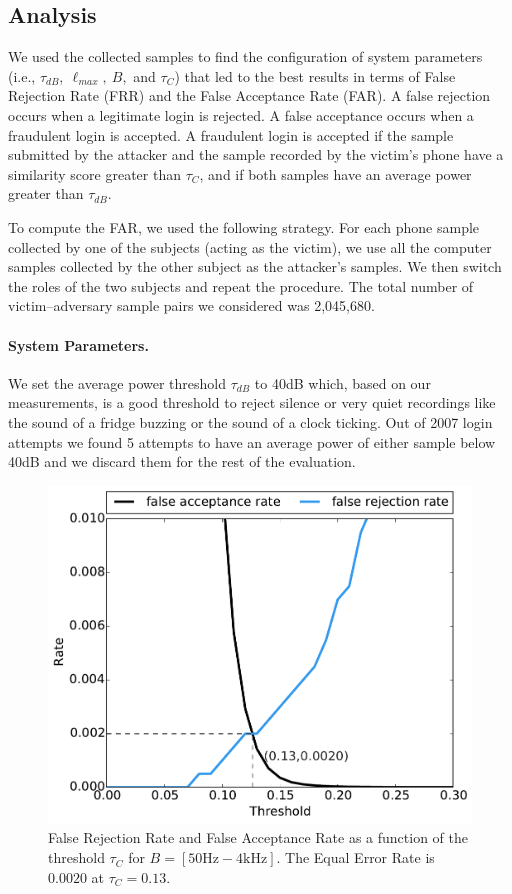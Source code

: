 \subsection{Analysis}
\label{sec:ps_sp_parameters}
We used the collected samples to find the configuration of system parameters (i.e., $\tau_{dB},\ \ell_{max},\ B,$ and $\tau_C$) that led to
the best results in terms of False Rejection Rate (FRR) and the False Acceptance Rate (FAR).
A false rejection occurs when a legitimate login is rejected.
A false acceptance occurs when a fraudulent login is accepted.
A fraudulent login is accepted if the sample submitted by the attacker
and the sample recorded by the victim's phone have a similarity score greater than $\tau_C$, and if both samples have an average power greater than $\tau_{dB}$.

To compute the FAR, we used the following strategy.
For each phone sample collected by one of the subjects (acting as the victim),
we use all the computer samples collected by the other subject as the attacker's samples. We then switch the roles of the two subjects and repeat the procedure.
The total number of victim--adversary sample pairs we considered was
2,045,680.

\paragraph{System Parameters.}
We set the average power threshold $\tau_{dB}$ to 40dB which, based on our measurements,
is a good threshold to reject silence or very quiet recordings like the sound of a fridge buzzing or the sound of a clock ticking.
Out of 2007 login attempts we found 5 attempts to have an average power of either sample below 40dB and we discard them for the rest of the evaluation.

\begin{figure}[!ht]
    \centering
    \includegraphics[width=.8\linewidth]{figures/phonesecures/sound-proof_falsepositives_50-4000.pdf}
    
    \caption[{False Rejection Rate and False Acceptance Rate as a function of the
    threshold $\tau_C$ for $B=[50\text{Hz}-4\text{kHz}]$}]{False Rejection Rate and
    False Acceptance Rate as a function of the threshold $\tau_C$ for
    $B=[50\text{Hz}-4\text{kHz}]$. The Equal Error Rate is $0.0020$ at $\tau_{C}=0.13.$}
    
    \label{fig:ps_sp_eer_average}
\end{figure}

